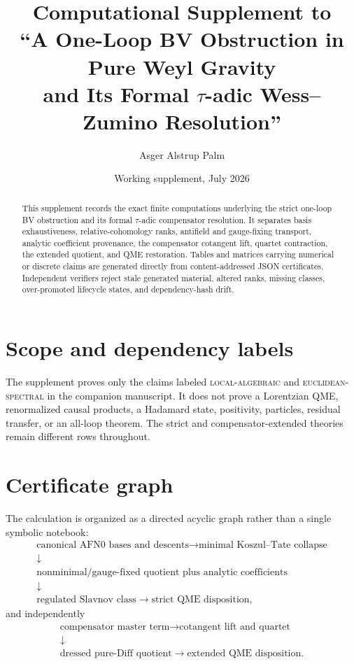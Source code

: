 \documentclass[11pt]{article}
\title{Computational Supplement to\\
``A One-Loop BV Obstruction in Pure Weyl Gravity\\
and Its Formal \texorpdfstring{$\tau$}{tau}-adic Wess--Zumino Resolution''}
\author{Asger Alstrup Palm}
\date{Working supplement, July 2026}
\theoremstyle{definition}
\theoremstyle{remark}
\begin{document}
\maketitle

\begin{abstract}
This supplement records the exact finite computations underlying the strict
one-loop BV obstruction and its formal $\tau$-adic compensator resolution.  It
separates basis exhaustiveness, relative-cohomology ranks, antifield and
gauge-fixing transport, analytic coefficient provenance, the compensator
cotangent lift, quartet contraction, the extended quotient, and QME
restoration.  Tables and matrices carrying numerical or discrete claims are
generated directly from content-addressed JSON certificates.  Independent
verifiers reject stale generated material, altered ranks, missing classes,
over-promoted lifecycle states, and dependency-hash drift.
\end{abstract}

\section*{Scope and dependency labels}

The supplement proves only the claims labeled \textsc{local-algebraic} and
\textsc{euclidean-spectral} in the companion manuscript.  It does not prove
a Lorentzian QME, renormalized causal products, a Hadamard state, positivity,
particles, residual transfer, or an all-loop theorem.  The strict and
compensator-extended theories remain different rows throughout.

\tableofcontents

\section{Certificate graph}

The calculation is organized as a directed acyclic graph rather than a single
symbolic notebook:
\[
\begin{gathered}
\text{canonical AFN0 bases and descents}
\longrightarrow \text{minimal Koszul--Tate collapse}
\\[1mm]
\downarrow\\[-1mm]
\text{nonminimal/gauge-fixed quotient plus analytic coefficients}
\\[1mm]
\downarrow\\[-1mm]
\text{regulated Slavnov class}
\longrightarrow \text{strict QME disposition},
\end{gathered}
\]
and independently
\[
\begin{gathered}
\text{compensator master term}
\longrightarrow \text{cotangent lift and quartet}
\\[1mm]
\downarrow\\[-1mm]
\text{dressed pure-Diff quotient}
\longrightarrow \text{extended QME disposition}.
\end{gathered}
\]
\end{document}
